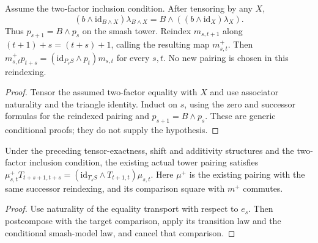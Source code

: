 \begin{proposition}
  \label{prop:h6-smash-pairing-right-transition}
  \leanok
  Assume the two-factor inclusion condition. After tensoring by any $X$,
  \[
    (b\wedge\mathrm{id}_{B\wedge X})\lambda_{B\wedge X}
      =B\wedge((b\wedge\mathrm{id}_X)\lambda_X).
  \]
  Thus $p_{s+1}=B\wedge p_s$ on the smash tower. Reindex $m_{s,t+1}$
  along $(t+1)+s=(t+s)+1$, calling the resulting map $m^+_{s,t}$.
  Then $m^+_{s,t}p_{t+s}=(\mathrm{id}_{P_sS}\wedge p_t)m_{s,t}$
  for every $s,t$. No new pairing is chosen in this reindexing.
\end{proposition}
\begin{proof}
  Tensor the assumed two-factor equality with $X$ and use associator
  naturality and the triangle identity. Induct on $s$, using the zero and
  successor formulas for the reindexed pairing and $p_{s+1}=B\wedge p_s$.
  These are generic conditional proofs; they do not supply the hypothesis.
  \leanok
\end{proof}

\begin{proposition}
  \label{prop:h6-existing-tower-pairing-right-transition}
  \leanok
  Under the preceding tensor-exactness, shift and additivity structures and
  the two-factor inclusion condition, the existing actual tower pairing
  satisfies
  $\mu^+_{s,t}T_{t+s+1,t+s}=(\mathrm{id}_{T_sS}\wedge T_{t+1,t})\mu_{s,t}$.
  Here $\mu^+$ is the existing pairing with the same successor reindexing,
  and its comparison square with $m^+$ commutes.
\end{proposition}
\begin{proof}
  Use naturality of the equality transport with respect to $e_s$. Then
  postcompose with the target comparison, apply its transition law and the
  conditional smash-model law, and cancel that comparison.
  \leanok
\end{proof}

